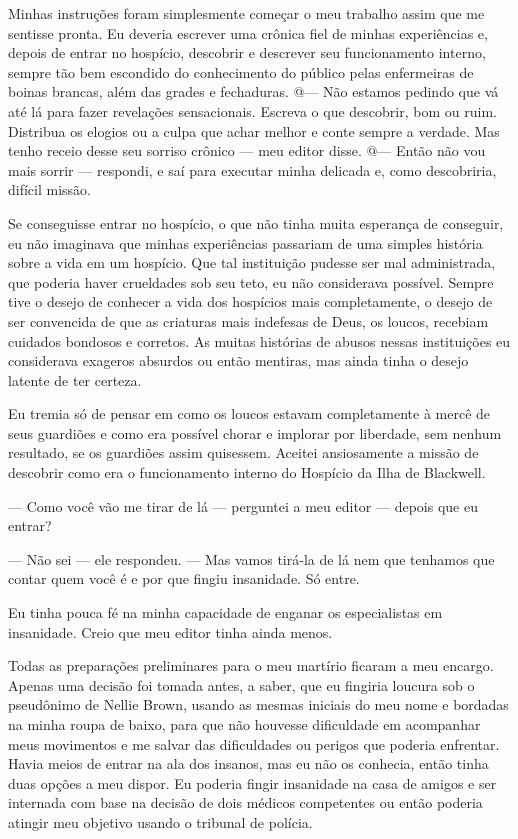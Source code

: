 Minhas instruções foram simplesmente começar o meu trabalho assim que me
sentisse pronta. Eu deveria escrever uma crônica fiel de minhas
experiências e, depois de entrar no hospício, descobrir e descrever seu
funcionamento interno, sempre tão bem escondido do conhecimento do
público pelas enfermeiras de boinas brancas, além das grades e
fechaduras. @--- Não estamos pedindo que vá até lá para fazer revelações
sensacionais. Escreva o que descobrir, bom ou ruim. Distribua os elogios
ou a culpa que achar melhor e conte sempre a verdade. Mas tenho receio
desse seu sorriso crônico --- meu editor disse. @--- Então não vou mais
sorrir --- respondi, e saí para executar minha delicada e, como
descobriria, difícil missão.

Se conseguisse entrar no hospício, o que não tinha muita esperança de
conseguir, eu não imaginava que minhas experiências passariam de uma
simples história sobre a vida em um hospício. Que tal instituição
pudesse ser mal administrada, que poderia haver crueldades sob seu teto,
eu não considerava possível. Sempre tive o desejo de conhecer a vida dos
hospícios mais completamente, o desejo de ser convencida de que as
criaturas mais indefesas de Deus, os loucos, recebiam cuidados bondosos
e corretos. As muitas histórias de abusos nessas instituições eu
considerava exageros absurdos ou então mentiras, mas ainda tinha o
desejo latente de ter certeza.

Eu tremia só de pensar em como os loucos estavam completamente à mercê
de seus guardiões e como era possível chorar e implorar por liberdade,
sem nenhum resultado, se os guardiões assim quisessem. Aceitei
ansiosamente a missão de descobrir como era o funcionamento interno do
Hospício da Ilha de Blackwell.

--- Como você vão me tirar de lá --- perguntei a meu editor --- depois
que eu entrar?

--- Não sei --- ele respondeu. --- Mas vamos tirá-la de lá nem que
tenhamos que contar quem você é e por que fingiu insanidade. Só entre.

Eu tinha pouca fé na minha capacidade de enganar os especialistas em
insanidade. Creio que meu editor tinha ainda menos.

Todas as preparações preliminares para o meu martírio ficaram a meu
encargo. Apenas uma decisão foi tomada antes, a saber, que eu fingiria
loucura sob o pseudônimo de Nellie Brown, usando as mesmas iniciais do
meu nome e bordadas na minha roupa de baixo, para que não houvesse
dificuldade em acompanhar meus movimentos e me salvar das dificuldades
ou perigos que poderia enfrentar. Havia meios de entrar na ala dos
insanos, mas eu não os conhecia, então tinha duas opções a meu dispor.
Eu poderia fingir insanidade na casa de amigos e ser internada com base
na decisão de dois médicos competentes ou então poderia atingir meu
objetivo usando o tribunal de polícia.

